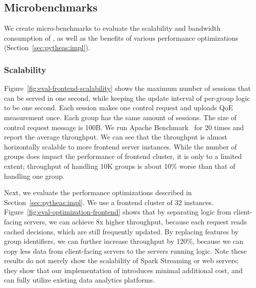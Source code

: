 \subsection{Microbenchmarks}

\label{sec:eval:scale}

We create micro-benchmarks to evaluate the scalability and bandwidth
consumption of \name, as well as the benefits of various performance optimizations (Section~\ref{sec:pytheas:impl}).




\subsubsection{Scalability}
Figure~\ref{fig:eval-frontend-scalability} shows the maximum number of sessions that can be served in one second, while keeping the update interval of per-group logic to be one second. 
Each session makes one control request and uploads QoE measurement once. Each group has the same amount of sessions.
The size of control request message is 100B. We run Apache Benchmark~\cite{ab} for 20 times and report the average throughput.
We can see that the throughput is almost horizontally scalable to more frontend server instances. 
 While  the number of groups does impact the performance of frontend cluster, it is only to a limited extent; throughput of handling 10K groups is about 10\% worse than that of handling one group.

Next, we evaluate the performance optimizations described in Section~\ref{sec:pytheas:impl}.
We use a frontend cluster of 32 instances.
Figure~\ref{fig:eval-optimization-frontend} shows that by separating \mab logic from client-facing servers, we can achieve 8x higher throughput, because each request reads cached decisions, which are still frequently updated.
By replacing features by group identifiers, we can further increase throughput  by 120\%, because we can copy less data from client-facing servers to the servers running \mab logic.
Note these results do not merely show the scalability of Spark Streaming or web servers; they show that our implementation of \name introduces minimal additional cost, and can fully utilize existing data analytics platforms.

